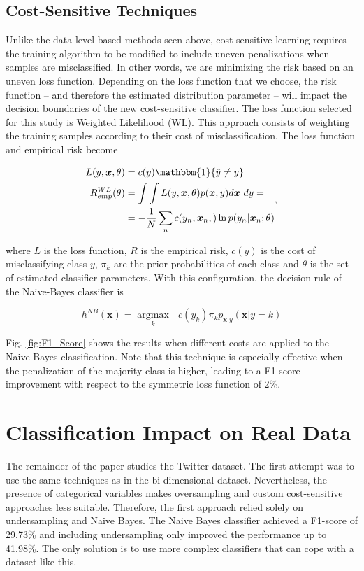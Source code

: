\documentclass[conference]{IEEEtran}
\begin{document}
	\subsection{Cost-Sensitive Techniques}
	Unlike the data-level based methods seen above, cost-sensitive learning requires the training algorithm to be modified to include uneven penalizations when samples are misclassified. In other words, we are minimizing the risk based on an uneven loss function. Depending on the loss function that we choose, the risk function -- and therefore the estimated distribution parameter -- will impact the decision boundaries of the new cost-sensitive classifier. The loss function selected for this study is Weighted Likelihood (WL). This approach consists of weighting the training samples according to their cost of misclassification. The loss function and empirical risk become
	
	\begin{equation*}
	\begin{aligned} \label{costWL}
			L(y,\boldsymbol x, \theta) &= c(y)\mathbbm{1}\{ \hat y \neq y \} \\
			R^{WL}_{emp}(\theta) &= \int \int L(y,\boldsymbol x, \theta) p(\boldsymbol x, y) d\boldsymbol x \text{ }dy=\\
				      &=-\frac{1}{N} \sum_n c(y_n,\boldsymbol x_n,) \ln p(y_n | \boldsymbol x_n;\theta)
		\end{aligned},
	\end{equation*}
	
	where $L$ is the loss function, $R$ is the empirical risk, $c(y)$ is the cost of misclassifying class $y$, $\pi_k$ are the prior probabilities of each class and $\theta$ is the set of estimated classifier parameters. With this configuration, the decision rule of the Naive-Bayes classifier is
	
	$$ h^{NB}(\boldsymbol x) = \underset{k}{\operatorname{argmax}} \text{ } c(y_k) \pi_k p_{\boldsymbol x | y}(\boldsymbol x|y=k)$$
	
	Fig. \ref{fig:F1_Score} shows the results when different costs are applied to the Naive-Bayes classification. Note that this technique is especially effective when the penalization of the majority class is higher, leading to a F1-score improvement with respect to the symmetric loss function of 2\%.
	
\section{Classification Impact on Real Data}
The remainder of the paper studies the Twitter dataset. The first attempt was to use the same techniques as in the bi-dimensional dataset. Nevertheless, the presence of categorical variables makes oversampling and custom cost-sensitive approaches less suitable. Therefore, the first approach relied solely on undersampling and Naive Bayes. The Naive Bayes classifier achieved a F1-score of 29.73\% and including undersampling only improved the performance up to 41.98\%. The only solution is to use more complex classifiers that can cope with a dataset like this.
\end{document}
